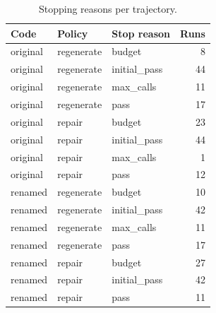\begin{table}[t]
\centering\small
\caption{Stopping reasons per trajectory.}
\label{tab:stops}
\begin{tabular}{lllr}
\toprule
Code & Policy & Stop reason & Runs \\
\midrule
original & regenerate & budget & 8 \\
original & regenerate & initial\_pass & 44 \\
original & regenerate & max\_calls & 11 \\
original & regenerate & pass & 17 \\
original & repair & budget & 23 \\
original & repair & initial\_pass & 44 \\
original & repair & max\_calls & 1 \\
original & repair & pass & 12 \\
renamed & regenerate & budget & 10 \\
renamed & regenerate & initial\_pass & 42 \\
renamed & regenerate & max\_calls & 11 \\
renamed & regenerate & pass & 17 \\
renamed & repair & budget & 27 \\
renamed & repair & initial\_pass & 42 \\
renamed & repair & pass & 11 \\
\bottomrule
\end{tabular}
\end{table}
